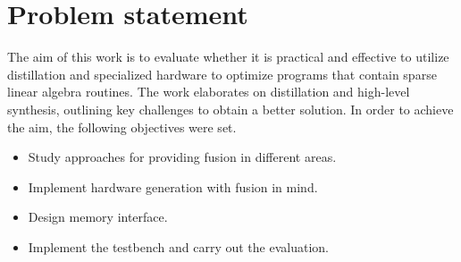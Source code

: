 \section*{Problem statement}
The aim of this work is to evaluate whether it is practical and effective to utilize distillation and specialized hardware to optimize programs that contain sparse linear algebra routines. The work elaborates on distillation and high-level synthesis, outlining key challenges to obtain a better solution. In order to achieve the aim, the following objectives were set.
\begin{itemize}
    \item Study approaches for providing fusion in different areas.
    \item Implement hardware generation with fusion in mind.
    \item Design memory interface.
    \item Implement the testbench and carry out the evaluation.
\end{itemize}